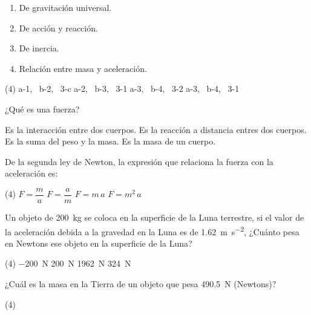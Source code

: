 \documentclass[12pt, letter]{exam}
\begin{document}
\begin{questions}
\begin{minipage}[t]{0.4\linewidth}
    \end{minipage}
    \hspace{-0.5cm}
    \begin{minipage}[t]{0.5\linewidth}
        \begin{enumerate}[label=\arabic*)]
            \itemsep0em
            \item De gravitación universal.
            \item De acción y reacción.
            \item De inercia.
            \item Relación entre masa y aceleración.
        \end{enumerate}
    \end{minipage}
    \begin{tasks}(4)
        \task a-1, \, b-2, \, 3-c
        \task a-2, \, b-3, \, 3-1
        \task a-3, \, b-4, \, 3-2
        \task a-3, \, b-4, \, 3-1
    \end{tasks}
    \question ¿Qué es una fuerza?
    \begin{tasks}
        \task Es la interacción entre dos cuerpos.
        \task Es la reacción a distancia entres dos cuerpos.
        \task Es la suma del peso y la masa.
        \task Es la masa de un cuerpo.
    \end{tasks}
    \question De la segunda ley de Newton, la expresión que relaciona la fuerza con la aceleración es:
    \begin{tasks}(4)
        \task $F = \dfrac{m}{a}$
        \task $F = \dfrac{a}{m}$
        \task $F = m \, a$
        \task $F = m^{2} \, a$
    \end{tasks}
    \question Un objeto de \SI{200}{\kilo\gram} se coloca en la superficie de la Luna terrestre, si el valor de la aceleración debida a la gravedad en la Luna es de \SI{1.62}{\meter\per\square\second}, ¿Cuánto pesa en Newtons ese objeto en la superficie de la Luna?
    \begin{tasks}(4)
        \task \SI{-200}{\newton}
        \task \SI{200}{\newton}
        \task \SI{1962}{\newton}
        \task \SI{324}{\newton}
    \end{tasks}
    \question ¿Cuál es la masa en la Tierra de un objeto que pesa \SI{490.5}{\newton} (Newtons)?
    \begin{tasks}(4)

\end{tasks}
\end{questions}
\end{document}
